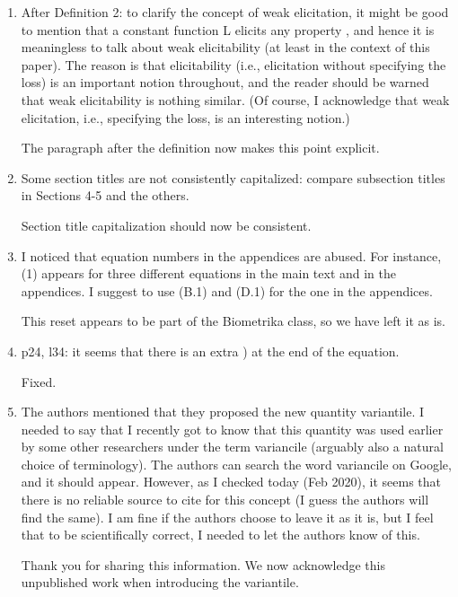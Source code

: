 \documentclass[a4paper]{article}
\begin{document}
\begin{enumerate}
\item After Definition 2: to clarify the concept of weak elicitation, it might be good to mention
that a constant function L elicits any property , and hence it is meaningless to talk about
weak elicitability (at least in the context of this paper). The reason is that elicitability
(i.e., elicitation without specifying the loss) is an important notion throughout, and the reader
should be warned that weak elicitability is nothing similar. (Of course, I acknowledge that
weak elicitation, i.e., specifying the loss, is an interesting notion.)

The paragraph after the definition now makes this point explicit.

\item Some section titles are not consistently capitalized: compare subsection titles in Sections 4-5 and the others.

Section title capitalization should now be consistent.

\item I noticed that equation numbers in the appendices are abused. For instance, (1) appears for
three different equations in the main text and in the appendices. I suggest to use (B.1) and
(D.1) for the one in the appendices.

This reset appears to be part of the Biometrika class, so we have left it as is.

\item p24, l34: it seems that there is an extra ) at the end of the equation.

Fixed.

\item The authors mentioned that they proposed the new quantity variantile. I needed to say that
I recently got to know that this quantity was used earlier by some other researchers under the
term variancile (arguably also a natural choice of terminology). The authors can search the
word variancile on Google, and it should appear. However, as I checked today (Feb 2020),
it seems that there is no reliable source to cite for this concept (I guess the authors will find
the same). I am fine if the authors choose to leave it as it is, but I feel that to be scientifically
correct, I needed to let the authors know of this.

Thank you for sharing this information.  We now acknowledge this unpublished work when introducing the variantile.

\end{enumerate}
\end{document}
